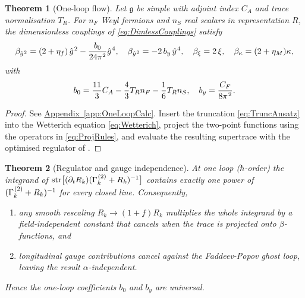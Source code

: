 \documentclass[pdflatex,sn-mathphys-num]{sn-jnl}
\theoremstyle{thmstyleone}
\newtheorem{theorem}{Theorem}
\theoremstyle{thmstyletwo}%
\theoremstyle{thmstylethree}%
\newcommand{\str}{\operatorname{str}}
\newcommand{\sm}{\hspace{.065em}}
\newcommand{\appref}[1]{\hyperref[#1]{Appendix~\ref*{#1}}}
\newcommand{\smexp}[1]{^{\sm #1}}
\begin{document}
\begin{theorem}[One-loop flow]\label{thm:OneLoop}
Let \(\mathfrak g\) be simple with adjoint index \(C_{A}\) and trace normalisation \(T_{R}\).  
For \(n_{F}\) Weyl fermions and \(n_{S}\) real scalars in representation \(R\),
the dimensionless couplings of \eqref{eq:DimlessCouplings} satisfy
\[
  \beta_{\hat g\smexp{2}}
  =(2+\eta_{f})\,\hat g\smexp{2}
   -\frac{b_{0}}{24\pi^{2}}\hat g\smexp{4},
  \quad
  \beta_{\hat y\smexp{2}}
    =-2\,b_{y}\,\hat y\smexp{4},
  \quad
  \beta_{\xi}=2\,\xi,
  \quad
  \beta_{\kappa}=(2+\eta_{M})\kappa,
\]
with
\[
  b_{0}
    =\frac{11}{3}C_{A}
     -\frac{4}{3}T_{R}n_{F}
     -\frac16 T_{R}n_{S},
  \quad
  b_{y}=\frac{C_{F}}{8\pi\smexp{2}}.
\]
\end{theorem}

\begin{proof}
See \appref{app:OneLoopCalc}. Insert the truncation \eqref{eq:TruncAnsatz} into
the Wetterich equation \eqref{eq:Wetterich}, project the two-point functions using
the operators in \eqref{eq:ProjRules}, and evaluate the resulting supertrace with
the optimised regulator of \cite{Litim:2001fd}.
\end{proof}

\begin{theorem}[Regulator and gauge independence]\label{thm:RegIndep}
At one loop (\(\hbar\)-order) the integrand of  
\(
  \str\bigl[(\partial_{t}R_{k})
  (\Gamma_{k}\smexp{(2)}+R_{k})^{-1}\bigr]
\)
contains exactly one power of \((\Gamma_{k}\smexp{(2)}+R_{k})^{-1}\) for
every closed line. Consequently,
\begin{enumerate}[label=(\roman*)]
  \item any smooth rescaling \(R_{k}\to(1+f)R_{k}\) multiplies the whole
        integrand by a field‐independent constant that cancels when the
        trace is projected onto \(\beta\)-functions, and
  \item longitudinal gauge contributions cancel against the Faddeev-Popov
        ghost loop, leaving the result \(\alpha\)-independent.
\end{enumerate}
Hence the one-loop coefficients \(b_{0}\) and \(b_{y}\) are universal.
\end{theorem}
\end{document}
